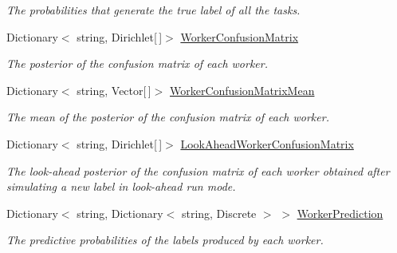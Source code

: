 \begin{DoxyCompactItemize}
\begin{DoxyCompactList}\small\item\em The probabilities that generate the true label of all the tasks. \end{DoxyCompactList}\item 
Dictionary$<$ string, Dirichlet\mbox{[}$\,$\mbox{]}$>$ \hyperlink{class_crowdsourcing_models_1_1_results_aeacd6050969e57759ccefe7760abfdff}{Worker\+Confusion\+Matrix}
\begin{DoxyCompactList}\small\item\em The posterior of the confusion matrix of each worker. \end{DoxyCompactList}\item 
Dictionary$<$ string, Vector\mbox{[}$\,$\mbox{]}$>$ \hyperlink{class_crowdsourcing_models_1_1_results_a3f83c2aa1c8067278b72de879e2683df}{Worker\+Confusion\+Matrix\+Mean}
\begin{DoxyCompactList}\small\item\em The mean of the posterior of the confusion matrix of each worker. \end{DoxyCompactList}\item 
Dictionary$<$ string, Dirichlet\mbox{[}$\,$\mbox{]}$>$ \hyperlink{class_crowdsourcing_models_1_1_results_a8c9bb0c3660f32404b453c169bb4e2e3}{Look\+Ahead\+Worker\+Confusion\+Matrix}
\begin{DoxyCompactList}\small\item\em The look-\/ahead posterior of the confusion matrix of each worker obtained after simulating a new label in look-\/ahead run mode. \end{DoxyCompactList}\item 
Dictionary$<$ string, Dictionary$<$ string, Discrete $>$ $>$ \hyperlink{class_crowdsourcing_models_1_1_results_ade5b969fe6b048391a8da32cc1f9a113}{Worker\+Prediction}
\begin{DoxyCompactList}\small\item\em The predictive probabilities of the labels produced by each worker. \end{DoxyCompactList}\item 

\end{DoxyCompactItemize}
